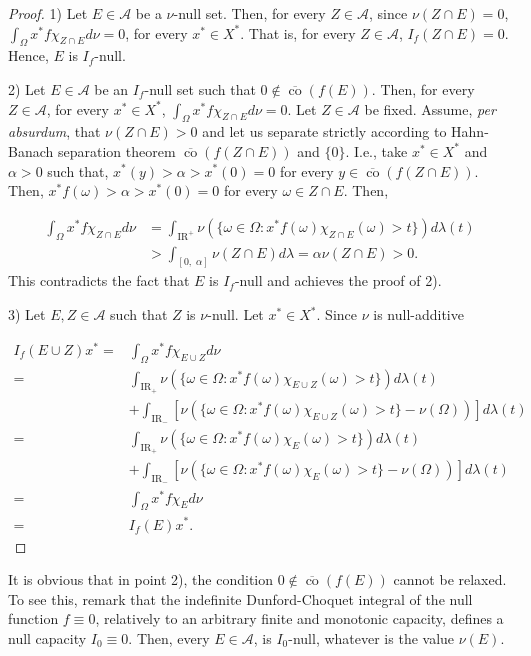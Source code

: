 \documentclass[preprint,authoryear,12pt]{article}%
\theoremstyle{definition}
\renewcommand{\AA}{{\mathcal A}}
\newcommand{\IR}{{\mathrm{I\!R}}}
\newcommand{\cob}{\overline{\mathop{\mathrm{co}}}}
\begin{document}
\begin{proof}
1) Let $E\in \AA$ be a $\nu$-null set. Then, for every $Z\in \AA$, since $\nu(Z\cap E)=0$,  $\int_\Omega x^*f \chi_{Z\cap E} d\nu =0$, for every $x^*\in X^*$. That is, for every $Z\in \AA$, $I_f(Z\cap E)=0$. Hence, $E$ is $I_f$-null.

2) Let $E\in \AA$ be an $I_f$-null set such that $0\notin \cob(f(E))$. Then, for every $Z\in \AA$, for every $x^*\in X^*$, $\int_\Omega x^* f \chi_{Z\cap E} d\nu=0$. Let $Z\in \AA$ be fixed. Assume, \emph{per absurdum}, that $\nu(Z\cap E)>0$ and let us separate strictly according to Hahn-Banach separation theorem $\cob (f(Z\cap E))$ and $\{0\}$. I.e., take $x^*\in X^*$ and $\alpha>0$ such that, $x^*(y)>\alpha>x^*(0)=0$ for every $y\in \cob(f(Z\cap E))$. Then,  $x^*f(\omega)>\alpha>x^*(0)=0$ for every $\omega\in Z\cap E$. Then, 

$$
\begin{array}{rl}
\int_\Omega x^* f \chi_{Z\cap E} d\nu& =\int_{\IR^+} \nu(\{\omega \in \Omega : x^*f(\omega)\chi_{Z\cap E}(\omega)>t\}) d\lambda(t)\\
&>\int_{[0,\; \alpha]} \nu(Z\cap E)d\lambda=\alpha\nu(Z\cap E)>0.
\end{array}
$$ 
This contradicts the fact that $E$ is $I_f$-null and achieves the proof of 2).


3)  Let $E,Z\in \AA$ such that $Z$ is $\nu$-null. Let $x^*\in X^*$. Since $\nu$ is null-additive

$$
\begin{array}{rl}
I_f(E\cup Z)x^*=&\int_\Omega x^*f \chi_{E\cup Z} d\nu\\
=&\int_{\IR_+} \nu(\{\omega \in \Omega : x^*f (\omega) \chi_{E\cup Z}(\omega)>t\})d\lambda(t)\\
& +\int_{\IR_-} [\nu(\{\omega \in \Omega : x^*f (\omega)\chi_{E\cup Z}(\omega)>t\}-\nu(\Omega))]d\lambda(t)\\
=&\int_{\IR_+} \nu(\{\omega \in \Omega  : x^*f (\omega)\chi_{E}(\omega)>t\})d\lambda(t) \\
&+ \int_{\IR_-} [\nu(\{\omega \in \Omega : x^*f (\omega)\chi_{E}(\omega)>t\}-\nu(\Omega))]d\lambda(t)\\
=&\int_\Omega x^*f \chi_E d\nu\\
=&I_f(E)x^*.
\end{array}
$$
\end{proof}

 It is obvious that in point 2), the condition $0\notin \cob(f(E))$ cannot be relaxed. To see this,  remark that the indefinite  Dunford-Choquet integral of the null function $f\equiv 0$, relatively to an arbitrary finite and monotonic capacity, defines a null capacity  $I_0\equiv 0$. Then, every $E\in \AA$, is $I_0$-null, whatever is 	the value $\nu(E)$.
\end{document}
